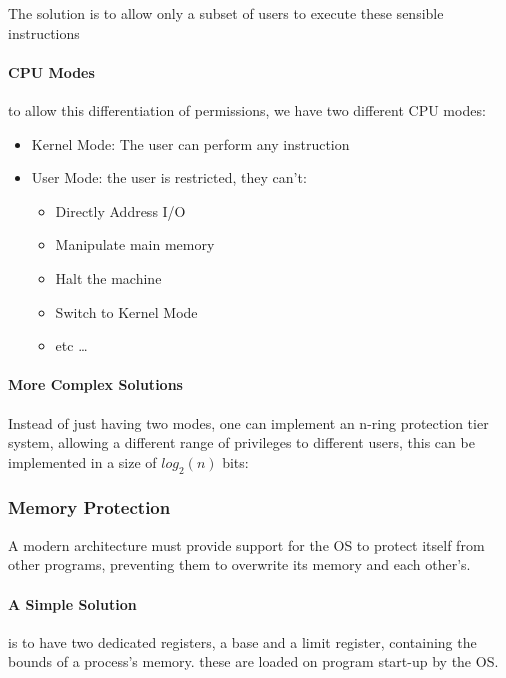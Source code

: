 \documentclass[openright, twoside]{report}
\theoremstyle{definition}
\theoremstyle{example}
\begin{document}
			The solution is to allow only a subset of users to execute these sensible instructions
			
			\paragraph{CPU Modes} to allow this differentiation of permissions, 
			we have two different CPU modes:
			
			\begin{itemize}
				\item Kernel Mode: The user can perform any instruction
				\item User Mode: the user is restricted, they can't:
				\begin{multicols}{2}
					\begin{itemize}
						\item Directly Address I/O
						\item Manipulate main memory
						\item Halt the machine
						\item Switch to Kernel Mode
						\item etc \dots
					\end{itemize}
				\end{multicols}
			\end{itemize}
			
			\paragraph{More Complex Solutions} Instead of just having two modes, 
			one can implement an n-ring protection tier system, allowing a different 
			range of privileges to different users, this can be implemented 
			in a size of $ log_2(n) $ bits:
			\subsubsection{Memory Protection}
				A modern architecture must provide support for the OS to protect 
				itself from other programs, preventing them to overwrite its 
				memory and each other's.
				
				\paragraph{A Simple Solution} is to have two dedicated registers, 
				a base and a limit register, containing the bounds of a process's memory. 
				these are loaded on program start-up by the OS.
				
\end{document}

